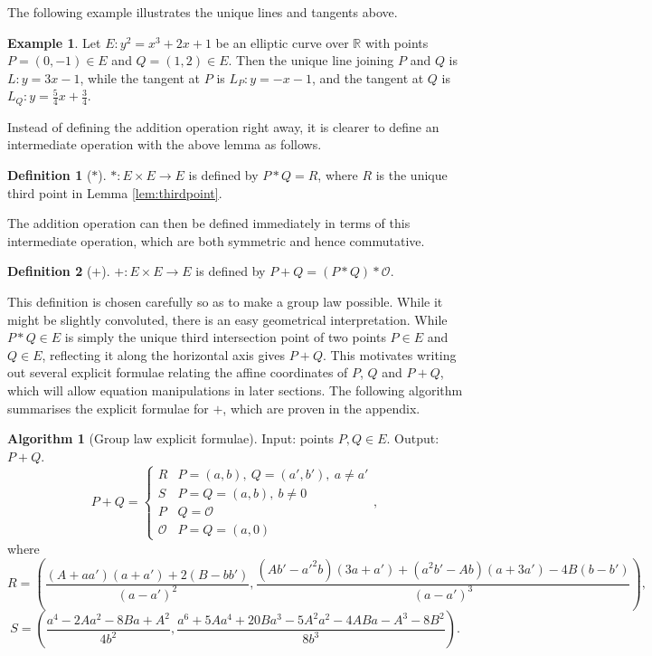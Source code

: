 \documentclass{article}
\newcommand{\R}{\mathbb{R}}
\newcommand{\rb}[1]{\left( #1 \right)}
\theoremstyle{definition}\newtheorem*{definition}{Definition}
\theoremstyle{definition}\newtheorem*{example}{Example}
\theoremstyle{definition}\newtheorem*{remark}{Remark}
\newtheorem{algorithm}[proposition]{Algorithm}
\begin{document}
The following example illustrates the unique lines and tangents above.

\begin{example}
Let $ E : y^2 = x^3 + 2x + 1 $ be an elliptic curve over $ \R $ with points $ P = \rb{0, -1} \in E $ and $ Q = \rb{1, 2} \in E $. Then the unique line joining $ P $ and $ Q $ is $ L : y = 3x - 1 $, while the tangent at $ P $ is $ L_P : y = -x - 1 $, and the tangent at $ Q $ is $ L_Q : y = \tfrac{5}{4}x + \tfrac{3}{4} $.
\end{example}

Instead of defining the addition operation right away, it is clearer to define an intermediate operation with the above lemma as follows.

\begin{definition}[$ * $]
$ * : E \times E \to E $ is defined by $ P * Q = R $, where $ R $ is the unique third point in Lemma \ref{lem:thirdpoint}.
\end{definition}

The addition operation can then be defined immediately in terms of this intermediate operation, which are both symmetric and hence commutative.

\begin{definition}[$ + $]
$ + : E \times E \to E $ is defined by $ P + Q = \rb{P * Q} * \mathcal{O} $.
\end{definition}

This definition is chosen carefully so as to make a group law possible. While it might be slightly convoluted, there is an easy geometrical interpretation. While $ P * Q \in E $ is simply the unique third intersection point of two points $ P \in E $ and $ Q \in E $, reflecting it along the horizontal axis gives $ P + Q $. This motivates writing out several explicit formulae relating the affine coordinates of $ P $, $ Q $ and $ P + Q $, which will allow equation manipulations in later sections. The following algorithm summarises the explicit formulae for $ + $, which are proven in the appendix.

\begin{algorithm}[Group law explicit formulae]
Input: points $ P, Q \in E $. Output: $ P + Q $.
$$ P + Q = \begin{cases} R & P = \rb{a, b}, \ Q = \rb{a', b'}, \ a \ne a' \\ S & P = Q = \rb{a, b}, \ b \ne 0 \\ P & Q = \mathcal{O} \\ \mathcal{O} & P = Q = \rb{a, 0} \end{cases}, $$
where
$$ R = \rb{\dfrac{\rb{A + aa'}\rb{a + a'} + 2\rb{B - bb'}}{\rb{a - a'}^2}, \dfrac{\rb{Ab' - a'^2b}\rb{3a + a'} + \rb{a^2b' - Ab}\rb{a + 3a'} - 4B\rb{b - b'}}{\rb{a - a'}^3}}, $$
$$ S = \rb{\dfrac{a^4 - 2Aa^2 - 8Ba + A^2}{4b^2}, \dfrac{a^6 + 5Aa^4 + 20Ba^3 - 5A^2a^2 - 4ABa - A^3 - 8B^2}{8b^3}}. $$
\end{algorithm}
\end{document}
